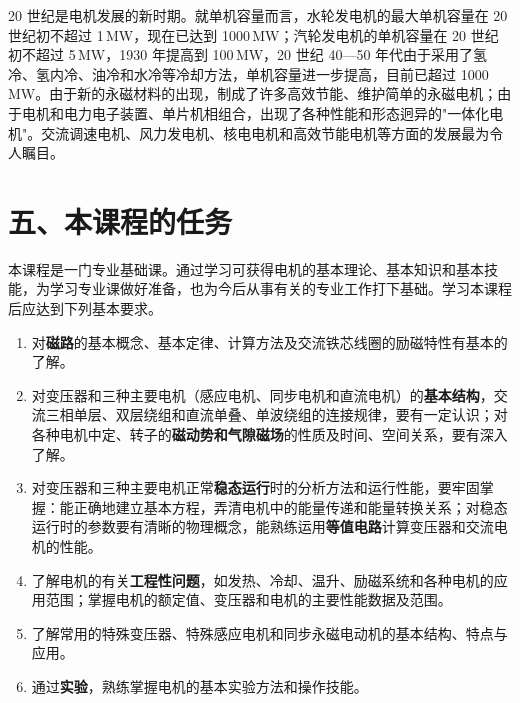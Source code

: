 20 世纪是电机发展的新时期。就单机容量而言，水轮发电机的最大单机容量在 20 世纪初不超过 1\,MW，现在已达到 1000\,MW；汽轮发电机的单机容量在 20 世纪初不超过 5\,MW，1930 年提高到 100\,MW，20 世纪 40—50 年代由于采用了氢冷、氢内冷、油冷和水冷等冷却方法，单机容量进一步提高，目前已超过 1000\,MW。由于新的永磁材料的出现，制成了许多高效节能、维护简单的永磁电机；由于电机和电力电子装置、单片机相组合，出现了各种性能和形态迥异的"一体化电机"。交流调速电机、风力发电机、核电电机和高效节能电机等方面的发展最为令人瞩目。

\section*{五、本课程的任务}

本课程是一门专业基础课。通过学习可获得电机的基本理论、基本知识和基本技能，为学习专业课做好准备，也为今后从事有关的专业工作打下基础。学习本课程后应达到下列基本要求。

\begin{enumerate}
  \item 对\textbf{磁路}的基本概念、基本定律、计算方法及交流铁芯线圈的励磁特性有基本的了解。
  \item 对变压器和三种主要电机（感应电机、同步电机和直流电机）的\textbf{基本结构}，交流三相单层、双层绕组和直流单叠、单波绕组的连接规律，要有一定认识；对各种电机中定、转子的\textbf{磁动势和气隙磁场}的性质及时间、空间关系，要有深入了解。
  \item 对变压器和三种主要电机正常\textbf{稳态运行}时的分析方法和运行性能，要牢固掌握：能正确地建立基本方程，弄清电机中的能量传递和能量转换关系；对稳态运行时的参数要有清晰的物理概念，能熟练运用\textbf{等值电路}计算变压器和交流电机的性能。
  \item 了解电机的有关\textbf{工程性问题}，如发热、冷却、温升、励磁系统和各种电机的应用范围；掌握电机的额定值、变压器和电机的主要性能数据及范围。
  \item 了解常用的特殊变压器、特殊感应电机和同步永磁电动机的基本结构、特点与应用。
  \item 通过\textbf{实验}，熟练掌握电机的基本实验方法和操作技能。
\end{enumerate}

